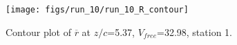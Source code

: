 \begin{figure}[H]
\centering
\texttt{[image: figs/run\_10/run\_10\_R\_contour]}
\caption{Contour plot of $\overline{r}$ at $z/c$=5.37, $V_{free}$=32.98, station 1.}
\label{fig:run_10_R_contour}
\end{figure}


